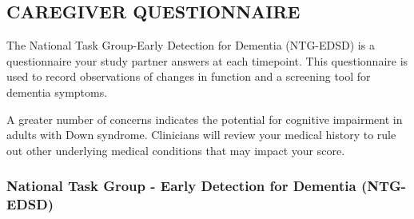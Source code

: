 \subsection{CAREGIVER QUESTIONNAIRE}

The National Task Group-Early Detection for Dementia (NTG-EDSD) is a questionnaire your study partner answers at each timepoint. This questionnaire is used to record observations of changes in function and a screening tool for dementia symptoms. 

A greater number of concerns indicates the potential for cognitive impairment in adults with Down syndrome. Clinicians will review your medical history to rule out other underlying medical conditions that may impact your score. 


\subsubsection{National Task Group - Early Detection for Dementia (NTG-EDSD)}

